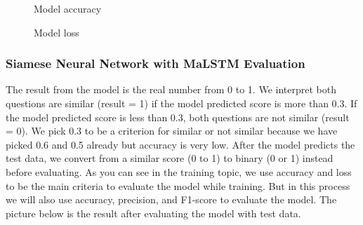 \documentclass[12pt,oneside,openright,a4paper]{cpe-english-project}
\begin{document}
\begin{figure}[!h]\centering
{}
\caption{Model accuracy}\label{fig:Model accuracy}
\end{figure}
\begin{figure}[!h]\centering
{}
\caption{Model loss}\label{fig:Model loss}
\end{figure}

\subsubsection{Siamese Neural Network with MaLSTM Evaluation}
The result from the model is the real number from 0 to 1. We interpret both questions are similar (result = 1) if the model predicted score is more than 0.3. If the model predicted score is less than 0.3, both questions are not similar (result = 0). We pick 0.3 to be a criterion for similar or not similar because we have picked 0.6 and 0.5 already but accuracy is very low. After the model predicts the test data, we convert from a similar score (0 to 1)  to binary (0 or 1) instead before evaluating. As you can see in the training topic, we use accuracy and loss to be the main criteria to evaluate the model while training. But in this process we will also use accuracy, precision, and F1-score to evaluate the model. The picture below is the result after evaluating the model with test data.
\end{document}
